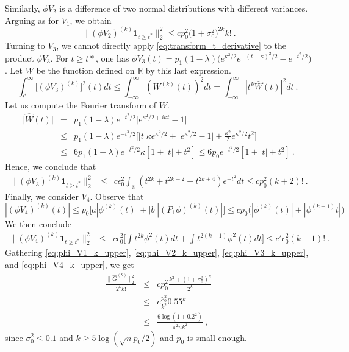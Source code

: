 \documentclass[twoside,11pt]{article}
\def\beq{\begin{equation}}
\def\eeq{\end{equation}}
\def\beqn{\begin{eqnarray*}}
\def\eeqn{\end{eqnarray*}}
\newcommand{\<}{\langle}
\renewcommand{\>}{\rangle}
\begin{document}
Similarly, $\phi V_2$ is a difference of two normal distributions with different variances. Arguing as for $V_1$, we obtain
\beq \label{eq:phi_V2_k_upper}
 \|(\phi  V_2)^{(k)}\mathbf{1}_{t\geq t^*}\|_2^2\leq cp_0^2 \big(1+\sigma_0^2\big)^{2k} k! \ .
\eeq
Turning to $V_3$, we cannot directly apply \eqref{eq:transform_t_derivative} to the product $\phi V_3$. For $t\geq t*$, one has $\phi V_3(t)= p_1(1-\lambda) \big(e^{\kappa^2/2}e^{-(t-\kappa)^2/2}- e^{-t^2/2}\big)$. Let $W$ be the function 
defined on $\mathbb{R}$ by this last expression. 
\[
 \int_{t^*}^{\infty}\big[(\phi V_3)^{(k)}\big]^2(t) dt \leq \int_{-\infty}^{\infty} (W^{(k)}(t))^2dt=\int_{-\infty}^{\infty} |t^k\widehat{W}(t)|^2dt\ .   \
\]
Let us compute the Fourier transform of $W$. 
\beqn 
\big|\widehat{W}(t)\big|& =& p_1 (1-\lambda)e^{-t^2/2}\big| e^{\kappa^2/2+ i\kappa t}- 1\big|\\
&\leq & p_1 (1-\lambda)e^{-t^2/2}\big[|t|\kappa e^{\kappa^2/2}+ \big|e^{\kappa^2/2}-1\big|+ \frac{\kappa^2}{2}e^{\kappa^2/2}t^2   \big]\\
&\leq & 6 p_1 (1-\lambda)e^{-t^2/2}\kappa[1+|t|+t^2]\leq 6p_0e^{-t^2/2}[1+|t|+t^2]\ .
\eeqn 
Hence, we conclude that 
\begin{eqnarray} 
\|(\phi  V_3)^{(k)}\mathbf{1}_{t\geq t^*}\|_2^2 &\leq& c \epsilon^2_0 \int_{\mathbb{R}} (t^{2k}+ t^{2k+2}+ t^{2k+4})e^{-t^2}dt \leq  c p_0^2   (k+2)! \ .\label{eq:phi_V3_k_upper}
\end{eqnarray}
Finally, we consider $V_4$. Observe that 
\[
 |(\phi V_4)^{(k)}(t)|\leq  p_0 \big[a |\phi^{(k)}(t)|+ |b| |( P_1\phi)^{(k)}(t)|\big]\leq c p_0\big(|\phi^{(k)}(t)|+ |\phi^{(k+1)}t|\big)
\]
We then conclude 
\begin{eqnarray} 
\|(\phi  V_4)^{(k)}\mathbf{1}_{t\geq t^*}\|_2^2 &\leq& c \epsilon^2_0\Big[\int t^{2k} \phi^2(t)dt + \int t^{2(k+1)}\phi^2(t) dt\Big] \leq  c' \epsilon^2_0 (k+1)!\ .\label{eq:phi_V4_k_upper}
\end{eqnarray}
Gathering \eqref{eq:phi_V1_k_upper}, \eqref{eq:phi_V2_k_upper}, \eqref{eq:phi_V3_k_upper}, and \eqref{eq:phi_V4_k_upper}, we get
\begin{eqnarray}  \nonumber
\frac{\|\widehat{G}^{(k)}\|_2^2}{2^k k!} &\leq& cp_0^2 \frac{k^2+ (1+\sigma_0^2)^k}{2^k}\\ 
&\leq & c\frac{p_0^2}{k^2} 0.55^k \nonumber\\
&\leq &  \frac{6\log(1+0.2^2)}{\pi^2 nk^2} \ , \label{eq:upper_phi_Vi_k_grand}
\end{eqnarray}
since $\sigma_0^2\leq 0.1$ and $k\geq 5\log(\sqrt{n} p_0/2)$ and $p_0$ is small enough. 
\end{document}
